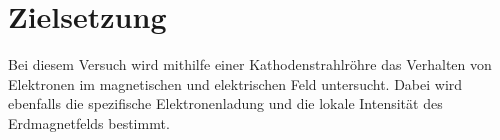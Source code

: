 \section{Zielsetzung}
\label{sec:Zielsetzung}
Bei diesem Versuch wird mithilfe einer Kathodenstrahlröhre das Verhalten von Elektronen im magnetischen und elektrischen Feld untersucht.
Dabei wird ebenfalls die spezifische Elektronenladung und die lokale Intensität des Erdmagnetfelds bestimmt.
